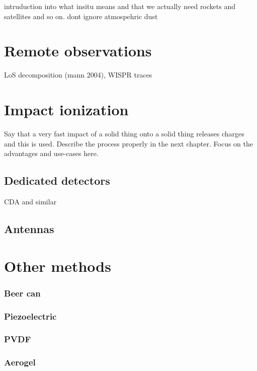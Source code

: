 intruduction into what insitu means and that we actually need rockets and satellites and so on. dont ignore atmospehric dust

\section{Remote observations}

LoS decomposition (mann 2004), WISPR traces

\section{Impact ionization}

Say that a very fast impact of a solid thing onto a solid thing releases charges and this is used. Describe the process properly in the next chapter. Focus on the advantages and use-cases here.

\subsection{Dedicated detectors}

CDA and similar

\subsection{Antennas}

\section{Other methods}

\subsubsection{Beer can}

\subsubsection{Piezoelectric}

\subsubsection{PVDF}

\subsubsection{Aerogel}
